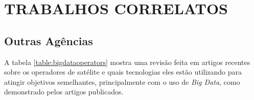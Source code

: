 
\chapter{TRABALHOS CORRELATOS}

\section{Outras Agências}

A tabela \ref{table:bigdataoperators} mostra uma revisão feita em artigos recentes sobre os operadores de satélite e quais tecnologias eles estão utilizando para atingir objetivos semelhantes, principalmente com o uso de \textit{Big Data}, como demonstrado pelos artigos publicados.

